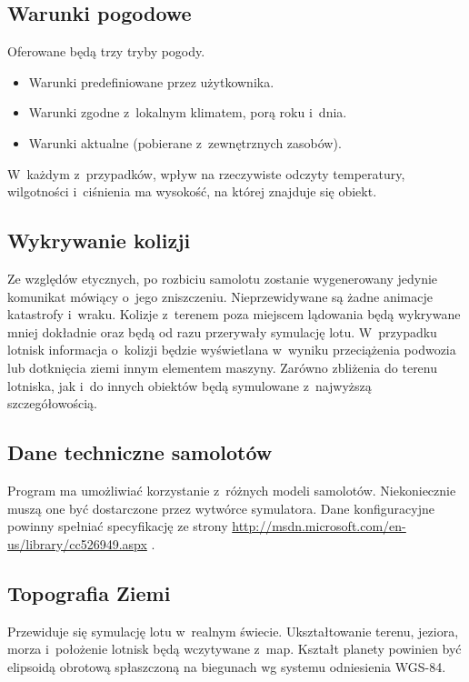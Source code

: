 \documentclass{mwrep}
\begin{document}
\subsection{Warunki pogodowe}
Oferowane będą trzy tryby pogody.

\begin{itemize}
\item Warunki predefiniowane przez użytkownika.
\item Warunki zgodne z~lokalnym klimatem, porą roku i~dnia.
\item Warunki aktualne (pobierane z~zewnętrznych zasobów).
\end{itemize}

W~każdym z~przypadków, wpływ na rzeczywiste odczyty temperatury, wilgotności i~ciśnienia ma wysokość, na której znajduje się obiekt.


\subsection{Wykrywanie kolizji}
Ze względów etycznych, po rozbiciu samolotu zostanie wygenerowany jedynie komunikat mówiący o~jego zniszczeniu. Nieprzewidywane są żadne animacje katastrofy i~wraku. Kolizje z~terenem poza miejscem lądowania będą wykrywane mniej dokładnie oraz będą od razu przerywały symulację lotu. W~przypadku lotnisk informacja o~kolizji będzie wyświetlana w~wyniku przeciążenia podwozia lub dotknięcia ziemi innym elementem maszyny. Zarówno zbliżenia do terenu lotniska, jak i~do innych obiektów będą symulowane z~najwyższą szczegółowością.

\subsection{Dane techniczne samolotów}
Program ma umożliwiać korzystanie z~różnych modeli samolotów. Niekoniecznie muszą one być dostarczone przez wytwórce symulatora. Dane konfiguracyjne powinny spełniać specyfikację ze strony \linebreak \url{http://msdn.microsoft.com/en-us/library/cc526949.aspx} .

\subsection{Topografia Ziemi}
Przewiduje się symulację lotu w~realnym świecie. Ukształtowanie terenu, jeziora, morza i~położenie lotnisk będą wczytywane z~map. Kształt planety powinien być elipsoidą obrotową spłaszczoną na biegunach wg systemu odniesienia WGS-84.
\end{document}
